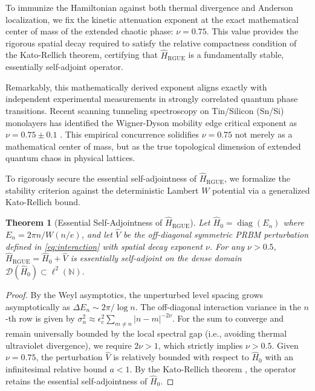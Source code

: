 \documentclass[prl,aps,floatfix,superscriptaddress,10pt]{revtex4-2}
\newtheorem{theorem}{Theorem}[section]
\newcommand{\N}{\mathbb{N}}
\begin{document}
To immunize the Hamiltonian against both thermal divergence and Anderson localization, we fix the kinetic attenuation exponent at the exact mathematical center of mass of the extended chaotic phase: \textbf{$\nu = 0.75$}. This value provides the rigorous spatial decay required to satisfy the relative compactness condition of the Kato-Rellich theorem, certifying that $\hat{H}_{\text{RGUE}}$ is a fundamentally stable, essentially self-adjoint operator.

Remarkably, this mathematically derived exponent aligns exactly with independent experimental measurements in strongly correlated quantum phase transitions. Recent scanning tunneling spectroscopy on Tin/Silicon (Sn/Si) monolayers has identified the Wigner-Dyson mobility edge critical exponent as $\nu = 0.75 \pm 0.1$ \cite{Geoffroy2025}. This empirical concurrence solidifies $\nu = 0.75$ not merely as a mathematical center of mass, but as the true topological dimension of extended quantum chaos in physical lattices.

To rigorously secure the essential self-adjointness of $\hat{H}_{\text{RGUE}}$, we formalize the stability criterion against the deterministic Lambert $W$ potential via a generalized Kato-Rellich bound.

\begin{theorem}[Essential Self-Adjointness of $\hat{H}_{\text{RGUE}}$]
\label{thm:kato_rellich_prbm}
Let $\hat{H}_0 = \operatorname{diag}(E_n)$ where $E_n = 2\pi n / W(n/e)$, and let $\hat{V}$ be the off-diagonal symmetric PRBM perturbation defined in \cref{eq:interaction} with spatial decay exponent $\nu$. For any $\nu > 0.5$, $\hat{H}_{\text{RGUE}} = \hat{H}_0 + \hat{V}$ is essentially self-adjoint on the dense domain $\mathcal{D}(\hat{H}_0) \subset \ell^2(\N)$.
\end{theorem}

\begin{proof}
By the Weyl asymptotics, the unperturbed level spacing grows asymptotically as $\Delta E_n \sim 2\pi / \log n$. The off-diagonal interaction variance in the $n$-th row is given by $\sigma_n^2 \approx \epsilon_c^2 \sum_{m \neq n} |n-m|^{-2\nu}$. For the sum to converge and remain universally bounded by the local spectral gap (i.e., avoiding thermal ultraviolet divergence), we require $2\nu > 1$, which strictly implies $\nu > 0.5$. Given $\nu = 0.75$, the perturbation $\hat{V}$ is relatively bounded with respect to $\hat{H}_0$ with an infinitesimal relative bound $a < 1$. By the Kato-Rellich theorem \cite{ReedSimon1975}, the operator retains the essential self-adjointness of $\hat{H}_0$.
\end{proof}
\end{document}
